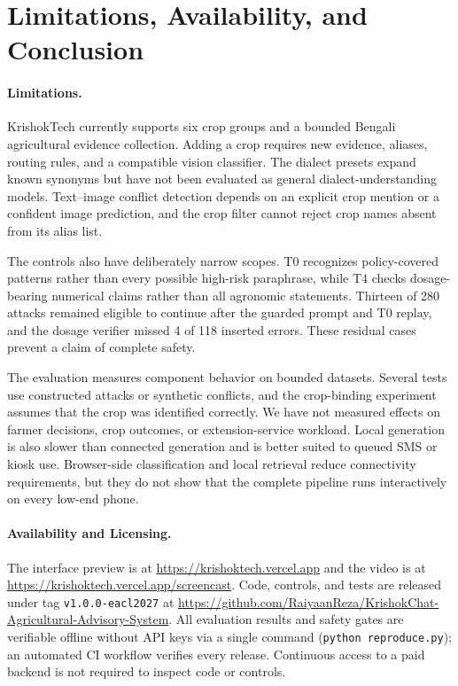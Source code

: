 \documentclass[11pt,a4paper]{article}
\begin{document}
\section{Limitations, Availability, and Conclusion}
\label{sec:conclusion}

\paragraph{Limitations.}
\label{sec:limitations}
KrishokTech currently supports six crop groups and a bounded Bengali agricultural evidence collection. Adding a crop requires new evidence, aliases, routing rules, and a compatible vision classifier. The dialect presets expand known synonyms but have not been evaluated as general dialect-understanding models. Text--image conflict detection depends on an explicit crop mention or a confident image prediction, and the crop filter cannot reject crop names absent from its alias list.

The controls also have deliberately narrow scopes. T0 recognizes policy-covered patterns rather than every possible high-risk paraphrase, while T4 checks dosage-bearing numerical claims rather than all agronomic statements. Thirteen of 280 attacks remained eligible to continue after the guarded prompt and T0 replay, and the dosage verifier missed 4 of 118 inserted errors. These residual cases prevent a claim of complete safety.

The evaluation measures component behavior on bounded datasets. Several tests use constructed attacks or synthetic conflicts, and the crop-binding experiment assumes that the crop was identified correctly. We have not measured effects on farmer decisions, crop outcomes, or extension-service workload. Local generation is also slower than connected generation and is better suited to queued SMS or kiosk use. Browser-side classification and local retrieval reduce connectivity requirements, but they do not show that the complete pipeline runs interactively on every low-end phone.

\paragraph{Availability and Licensing.}
\label{sec:availability}
The interface preview is at \url{https://krishoktech.vercel.app} and the video is at \url{https://krishoktech.vercel.app/screencast}. Code, controls, and tests are released under tag \texttt{v1.0.0-eacl2027} at \url{https://github.com/RaiyaanReza/KrishokChat-Agricultural-Advisory-System}. All evaluation results and safety gates are verifiable offline without API keys via a single command (\texttt{python reproduce.py}); an automated CI workflow verifies every release. Continuous access to a paid backend is not required to inspect code or controls.
\end{document}
